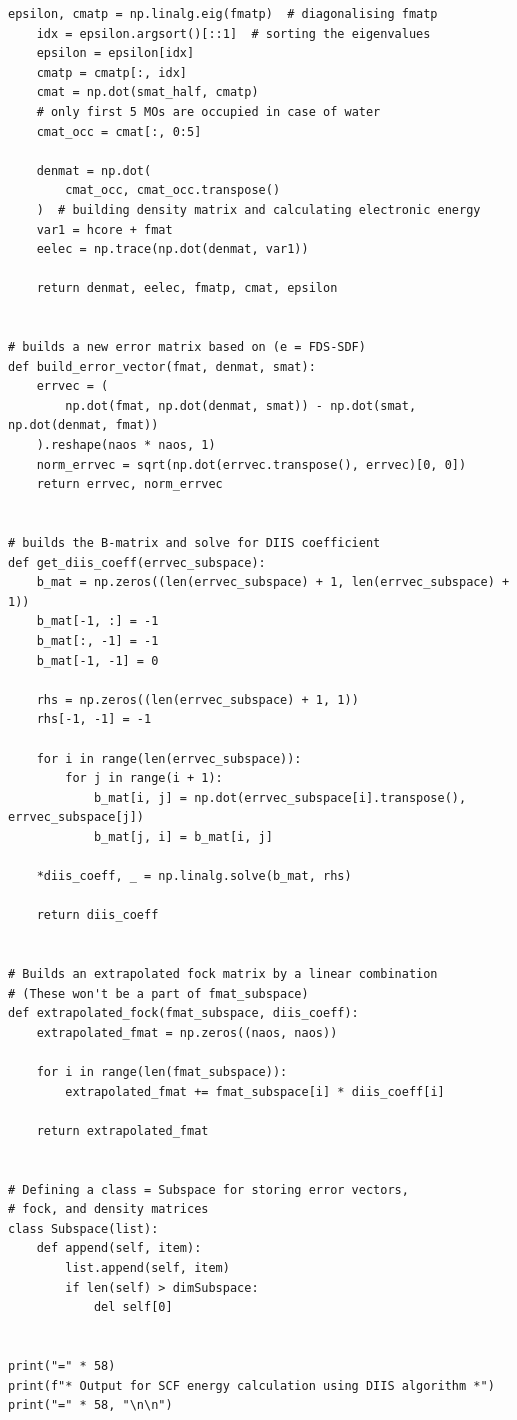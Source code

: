 \begin{lstlisting}[style=MyPython]
    epsilon, cmatp = np.linalg.eig(fmatp)  # diagonalising fmatp
    idx = epsilon.argsort()[::1]  # sorting the eigenvalues
    epsilon = epsilon[idx]
    cmatp = cmatp[:, idx]
    cmat = np.dot(smat_half, cmatp)
    # only first 5 MOs are occupied in case of water
    cmat_occ = cmat[:, 0:5]

    denmat = np.dot(
        cmat_occ, cmat_occ.transpose()
    )  # building density matrix and calculating electronic energy
    var1 = hcore + fmat
    eelec = np.trace(np.dot(denmat, var1))

    return denmat, eelec, fmatp, cmat, epsilon


# builds a new error matrix based on (e = FDS-SDF)
def build_error_vector(fmat, denmat, smat):
    errvec = (
        np.dot(fmat, np.dot(denmat, smat)) - np.dot(smat, np.dot(denmat, fmat))
    ).reshape(naos * naos, 1)
    norm_errvec = sqrt(np.dot(errvec.transpose(), errvec)[0, 0])
    return errvec, norm_errvec


# builds the B-matrix and solve for DIIS coefficient
def get_diis_coeff(errvec_subspace):
    b_mat = np.zeros((len(errvec_subspace) + 1, len(errvec_subspace) + 1))
    b_mat[-1, :] = -1
    b_mat[:, -1] = -1
    b_mat[-1, -1] = 0

    rhs = np.zeros((len(errvec_subspace) + 1, 1))
    rhs[-1, -1] = -1

    for i in range(len(errvec_subspace)):
        for j in range(i + 1):
            b_mat[i, j] = np.dot(errvec_subspace[i].transpose(), errvec_subspace[j])
            b_mat[j, i] = b_mat[i, j]

    *diis_coeff, _ = np.linalg.solve(b_mat, rhs)

    return diis_coeff


# Builds an extrapolated fock matrix by a linear combination
# (These won't be a part of fmat_subspace)
def extrapolated_fock(fmat_subspace, diis_coeff):
    extrapolated_fmat = np.zeros((naos, naos))

    for i in range(len(fmat_subspace)):
        extrapolated_fmat += fmat_subspace[i] * diis_coeff[i]

    return extrapolated_fmat


# Defining a class = Subspace for storing error vectors,
# fock, and density matrices
class Subspace(list):
    def append(self, item):
        list.append(self, item)
        if len(self) > dimSubspace:
            del self[0]


print("=" * 58)
print(f"* Output for SCF energy calculation using DIIS algorithm *")
print("=" * 58, "\n\n")



\end{lstlisting}
